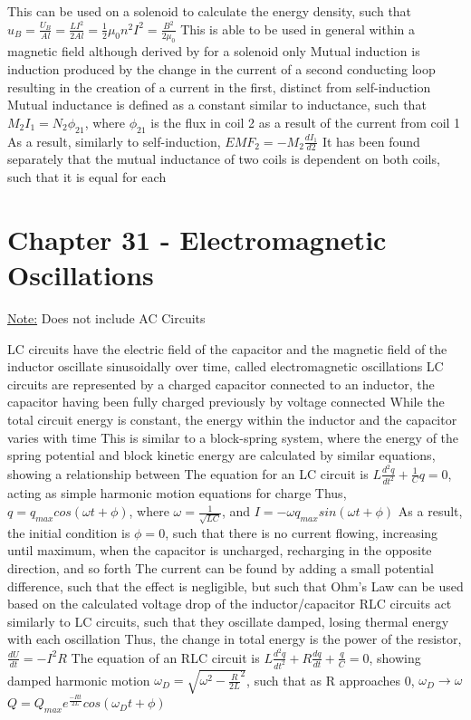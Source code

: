 \documentclass[11 pt, twoside]{article}
\newenvironment{outline*}
{
	\begin{outline}[enumerate]
	}
	{\end{outline}
}
\begin{document}
\begin{outline*}
\3 This can be used on a solenoid to calculate the energy density, such that $u_B = \frac{U_B}{Al} = \frac{LI^2}{2Al} = \frac{1}{2}\mu_0n^2I^2 = \frac{B^2}{2\mu_0}$
\4 This is able to be used in general within a magnetic field although derived by for a solenoid only
\1 Mutual induction is induction produced by the change in the current of a second conducting loop resulting in the creation of a current in the first, distinct from self-induction
\2 Mutual inductance is defined as a constant similar to inductance, such that $M_2I_1 = N_2\phi_{21}$, where $\phi_{21}$ is the flux in coil 2 as a result of the current from coil 1
\2 As a result, similarly to self-induction, $EMF_2 = -M_2\frac{dI_1}{d2}$
\2 It has been found separately that the mutual inductance of two coils is dependent on both coils, such that it is equal for each
\end{outline*}
\section{Chapter 31 - Electromagnetic Oscillations}
\underline{Note:} Does not include AC Circuits
\begin{outline*}
\1 LC circuits have the electric field of the capacitor and the magnetic field of the inductor oscillate sinusoidally over time, called electromagnetic oscillations
\2 LC circuits are represented by a charged capacitor connected to an inductor, the capacitor having been fully charged previously by voltage connected
\2 While the total circuit energy is constant, the energy within the inductor and the capacitor varies with time
\3 This is similar to a block-spring system, where the energy of the spring potential and block kinetic energy are calculated by similar equations, showing a relationship between
\2 The equation for an LC circuit is $L\frac{d^2q}{dt^2} + \frac{1}{C}q = 0$, acting as simple harmonic motion equations for charge
\3 Thus, $q = q_{max}cos(\omega t + \phi)$, where $\omega = \frac{1}{\sqrt{LC}}$, and $I = -\omega q_{max}sin(\omega t + \phi)$
\3 As a result, the initial condition is $\phi = 0$, such that there is no current flowing, increasing until maximum, when the capacitor is uncharged, recharging in the opposite direction, and so forth
\3 The current can be found by adding a small potential difference, such that the effect is negligible, but such that Ohm's Law can be used based on the calculated voltage drop of the inductor/capacitor
\1 RLC circuits act similarly to LC circuits, such that they oscillate damped, losing thermal energy with each oscillation
\2 Thus, the change in total energy is the power of the resistor, $\frac{dU}{dt} = -I^2R$
\2 The equation of an RLC circuit is $L\frac{d^2q}{dt^2} + R\frac{dq}{dt} + \frac{q}{C} = 0$, showing damped harmonic motion
\3 $\omega_{D} = \sqrt{\omega^2 - \frac{R}{2L}^2}$, such that as R approaches 0, $\omega_D \to \omega$
\3 $Q = Q_{max}e^{\frac{-Rt}{2L}}cos(\omega_Dt + \phi)$
\end{outline*}
\end{document}
